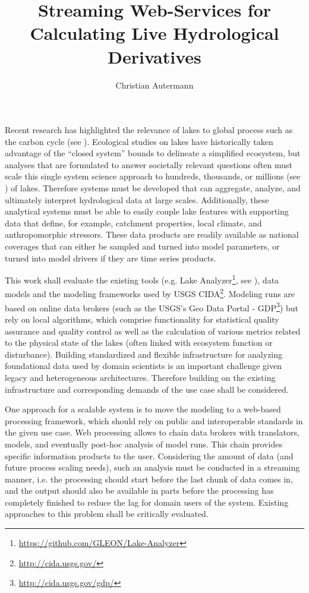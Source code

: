 \documentclass[paper=a4,fontsize=11pt]{scrartcl}
\title{Streaming Web-Services for Calculating Live Hydrological Derivatives}
\author{Christian Autermann}
\newcommand{\fu}[1]{\footnote{\url{#1}}}
\begin{document}
    \maketitle
    \onehalfspacing

    Recent research has highlighted the relevance of lakes to global process such as the carbon cycle (see \cite{cole}).
    Ecological studies on lakes have historically taken advantage of the “closed system” bounds to delineate a simplified ecosystem, but analyses that are formulated to answer societally relevant questions often must scale this single system science approach to hundreds, thousands, or millions (see \cite{downing}) of lakes.
    Therefore systems must be developed that can aggregate, analyze, and ultimately interpret hydrological data at large scales. Additionally, these analytical systems must be able to easily couple lake features with supporting data that define, for example, catchment properties, local climate, and anthropomorphic stressors.
    These data products are readily available as national coverages that can either be sampled and turned into model parameters, or turned into model drivers if they are time series products.

    This work shall evaluate the existing tools (e.g. Lake Analyzer\fu{https://github.com/GLEON/Lake-Analyzer}, see \cite{lakeanalyzer}), data models and the modeling frameworks used by USGS CIDA\fu{http://cida.usgs.gov/}.
    Modeling runs are based on online data brokers (such as the USGS’s Geo Data Portal - GDP\fu{http://cida.usgs.gov/gdp/}) but rely on local algorithms, which comprise functionality for statistical quality assurance and quality control as well as the calculation of various metrics related to the physical state of the lakes (often linked with ecosystem function or disturbance). Building standardized and flexible infrastructure for analyzing foundational data used by domain scientists is an important challenge given legacy and heterogeneous architectures.
    Therefore building on the existing infrastructure and corresponding demands of the use case shall be considered.

    One approach for a scalable system is to move the modeling to a web-based processing framework, which should rely on public and interoperable standards in the given use case.
    Web processing allows to chain data brokers with translators, models, and eventually post-hoc analysis of model runs.
    This chain provides specific information products to the user.
    Considering the amount of data (and future process scaling needs), such an analysis must be conducted in a streaming manner, i.e. the processing should start before the last chunk of data comes in, and the output should also be available in parts before the processing has completely finished to reduce the lag for domain users of the system.
    Existing approaches to this problem shall be critically evaluated.
\end{document}
